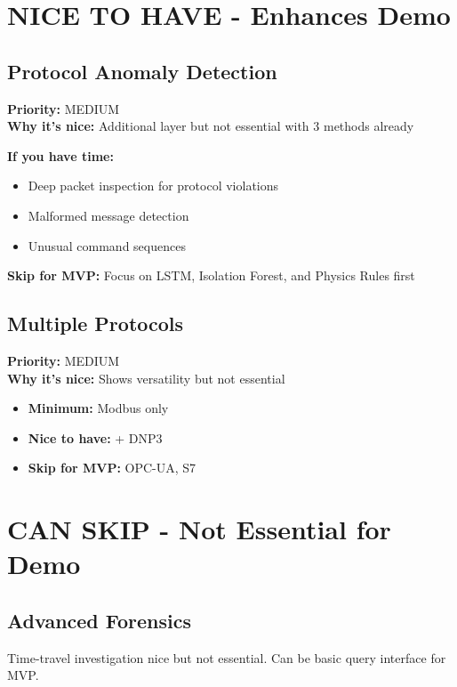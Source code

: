 \documentclass[11pt,a4paper]{article}
\begin{document}
\section{NICE TO HAVE - Enhances Demo}

\subsection{Protocol Anomaly Detection}

\textbf{Priority:} \textcolor{medium}{MEDIUM} \\
\textbf{Why it's nice:} Additional layer but not essential with 3 methods already

\textbf{If you have time:}
\begin{itemize}[leftmargin=*]
    \item Deep packet inspection for protocol violations
    \item Malformed message detection
    \item Unusual command sequences
\end{itemize}

\textbf{Skip for MVP:} Focus on LSTM, Isolation Forest, and Physics Rules first


\subsection{Multiple Protocols}

\textbf{Priority:} \textcolor{medium}{MEDIUM} \\
\textbf{Why it's nice:} Shows versatility but not essential

\begin{itemize}[leftmargin=*]
    \item \textbf{Minimum:} Modbus only
    \item \textbf{Nice to have:} + DNP3
    \item \textbf{Skip for MVP:} OPC-UA, S7
\end{itemize}

\section{CAN SKIP - Not Essential for Demo}

\subsection{Advanced Forensics}
Time-travel investigation nice but not essential. Can be basic query interface for MVP.
\end{document}
